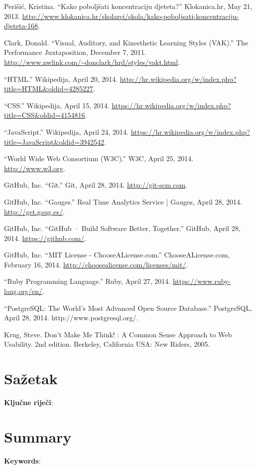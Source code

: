 \documentclass{scrreprt}
\begin{document}
\begin{thebibliography}{99}

  \raggedright

   Perišić, Kristina. “Kako poboljšati koncentraciju djeteta?”
    Klokanica.hr, May 21, 2013.
    \url{http://www.klokanica.hr/skolarci/skola/kako-poboljsati-koncentraciju-djeteta-168}.

   Clark, Donald. “Visual, Auditory, and Kinesthetic Learning
    Styles (VAK).” The Performance Juxtaposition, December 7, 2011.
    \url{http://www.nwlink.com/~donclark/hrd/styles/vakt.html}.

   “HTML.” Wikipedija, April 20, 2014.
    \url{http://hr.wikipedia.org/w/index.php?title=HTML&oldid=4285227}.

   “CSS.” Wikipedija, April 15, 2014.
    \url{https://hr.wikipedia.org/w/index.php?title=CSS&oldid=4154816}.

   “JavaScript.” Wikipedija, April 24, 2014.
    \url{https://hr.wikipedia.org/w/index.php?title=JavaScript&oldid=3942542}.

   “World Wide Web Consortium (W3C).” W3C, April 25, 2014.
    \url{http://www.w3.org}.

   GitHub, Inc. “Git.” Git, April 28, 2014.
    \url{http://git-scm.com}.

   GitHub, Inc. “Gauges.” Real Time Analytics Service | Gauges,
    April 28, 2014. \url{http://get.gaug.es/}.

   GitHub, Inc. “GitHub · Build Software Better, Together.”
    GitHub, April 28, 2014. \url{https://github.com/}.

   GitHub, Inc. “MIT License - ChooseALicense.com.”
    ChooseALicense.com, February 16, 2014.
    \url{http://choosealicense.com/licenses/mit/}.

   “Ruby Programming Language.” Ruby, April 27, 2014.
    \url{https://www.ruby-lang.org/en/}.

   “PostgreSQL: The World’s Most Advanced Open Source
    Database.” PostgreSQL, April 28, 2014. http://www.postgresql.org/.

   Krug, Steve. Don't Make Me Think! : A Common Sense Approach
    to Web Usability. 2nd edition. Berkeley, California USA: New Riders, 2005.

\end{thebibliography}

\chapter{Sažetak}

\textbf{Ključne riječi}:

\chapter{Summary}

\textbf{Keywords}:
\end{document}
